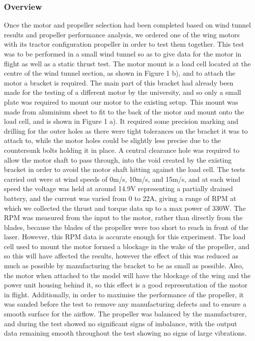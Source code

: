 \documentclass[../../main.tex]{subfiles}
\begin{document}
\subsubsection{Overview} \label{sec:design-process:interim-design-review:motor-and-propellor-test:overview}


Once the motor and propeller selection had been completed based on wind tunnel results and propeller performance analysis, we ordered one of the wing motors with its tractor configuration propeller in order to test them together.
This test was to be performed in a small wind tunnel so as to give data for the motor in flight as well as a static thrust test.
The motor mount is a load cell located at the centre of the wind tunnel section, as shown in Figure 1 b), and to attach the motor a bracket is required.
The main part of this bracket had already been made for the testing of a different motor by the university, and so only a small plate was required to mount our motor to the existing setup.
This mount was made from aluminium sheet to fit to the back of the motor and mount onto the load cell, and is shown in Figure 1 a).
It required some precision marking and drilling for the outer holes as there were tight tolerances on the bracket it was to attach to, while the motor holes could be slightly less precise due to the countersunk bolts holding it in place.
A central clearance hole was required to allow the motor shaft to pass through, into the void created by the existing bracket in order to avoid the motor shaft hitting against the load cell.
The tests carried out were at wind speeds of 0m/s, 10m/s, and 15m/s, and at each wind speed the voltage was held at around 14.9V representing a partially drained battery, and the current was varied from 0 to 22A, giving a range of RPM at which we collected the thrust and torque data up to a max power of 330W.
The RPM was measured from the input to the motor, rather than directly from the blades, because the blades of the propeller were too short to reach in front of the laser.
However, this RPM data is accurate enough for this experiment.
The load cell used to mount the motor formed a blockage in the wake of the propeller, and so this will have affected the results, however the effect of this was reduced as much as possible by manufacturing the bracket to be as small as possible.
Also, the motor when attached to the model will have the blockage of the wing and the power unit housing behind it, so this effect is a good representation of the motor in flight.
Additionally, in order to maximise the performance of the propeller, it was sanded before the test to remove any manufacturing defects and to ensure a smooth surface for the airflow.
The propeller was balanced by the manufacturer, and during the test showed no significant signs of imbalance, with the output data remaining smooth throughout the test showing no signs of large vibrations. 
\end{document}

